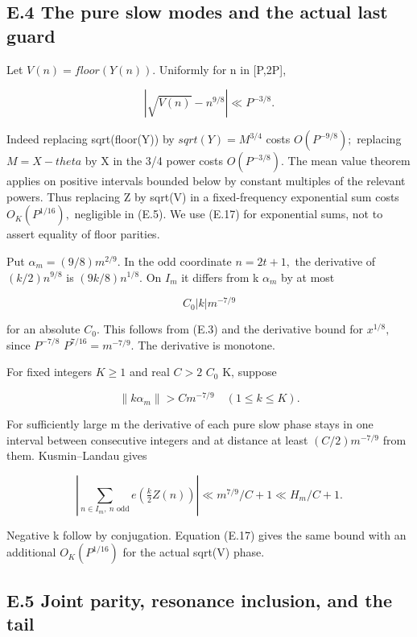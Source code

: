 \documentclass[11pt,a4paper]{article}
\begin{document}
\subsection{E.4 The pure slow modes and the actual last
guard}\label{e.4-the-pure-slow-modes-and-the-actual-last-guard}

Let \(V(n)=floor(Y(n)).\) Uniformly for n in {[}P,2P{]},

\[
 |\sqrt{V(n)}-n^{9/8}|\ll P^{-3/8}.
 \tag{E.17}
\]

Indeed replacing sqrt(floor(Y)) by \(sqrt(Y)=M^{3/4}\) costs
\(O(P^{-9/8});\) replacing \(M=X-theta\) by X in the 3/4 power costs
\(O(P^{-3/8}).\) The mean value theorem applies on positive intervals
bounded below by constant multiples of the relevant powers. Thus
replacing Z by sqrt(V) in a fixed-frequency exponential sum costs
\(O_K(P^{1/16}),\) negligible in (E.5). We use (E.17) for exponential
sums, not to assert equality of floor parities.

Put \(\alpha_m=(9/8)m^{2/9}.\) In the odd coordinate \(n=2t+1,\) the
derivative of \((k/2)n^{9/8}\) is \((9k/8)n^{1/8}.\) On \(I_m\) it
differs from k \(\alpha_m\) by at most

\[
 C_0 |k|m^{-7/9}
 \tag{E.18}
\]

for an absolute \(C_0.\) This follows from (E.3) and the derivative
bound for \(x^{1/8},\) since \(P^{-7/8}\) \(P^{7/16}=m^{-7/9}.\) The
derivative is monotone.

For fixed integers \(K\ge 1\) and real \(C>2\) \(C_0\) K, suppose

\[
 \|k\alpha_m\|>C m^{-7/9}\quad(1\le k\le K).
 \tag{E.19}
\]

For sufficiently large m the derivative of each pure slow phase stays in
one interval between consecutive integers and at distance at least
\((C/2)m^{-7/9}\) from them. Kusmin--Landau gives

\[
 \left|\sum_{n\in I_m,\ n\text{ odd}}e\left(\tfrac k2 Z(n)\right)\right|
       \ll m^{7/9}/C+1\ll H_m/C+1.
 \tag{E.20}
\]

Negative k follow by conjugation. Equation (E.17) gives the same bound
with an additional \(O_K(P^{1/16})\) for the actual sqrt(V) phase.

\subsection{E.5 Joint parity, resonance inclusion, and the
tail}\label{e.5-joint-parity-resonance-inclusion-and-the-tail}
\end{document}
